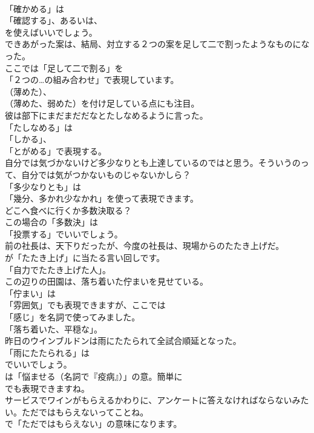 \documentclass[8pt]{extreport}
\begin{document}
\begin{CJK}{UTF8}{min}
\\	「確かめる」は
\\	「確認する」、あるいは、
\\	を使えばいいでしょう。	
\\	できあがった案は、結局、対立する２つの案を足して二で割ったようなものになった。 
\\	ここでは「足して二で割る」を 
\\	「２つの…の組み合わせ」で表現しています。
\\	（薄めた）、
\\	（薄めた、弱めた）を付け足している点にも注目。	
\\	彼は部下にまだまだだなとたしなめるように言った。 
\\	「たしなめる」は
\\	「しかる」、
\\	「とがめる」で表現する。	
\\	自分では気づかないけど多少なりとも上達しているのではと思う。そういうのって、自分では気がつかないものじゃないかしら？ 
\\	「多少なりとも」は
\\	「幾分、多かれ少なかれ」を使って表現できます。	
\\	どこへ食べに行くか多数決取る？ 
\\	この場合の「多数決」は
\\	「投票する」でいいでしょう。	
\\	前の社長は、天下りだったが、今度の社長は、現場からのたたき上げだ。 
\\	が「たたき上げ」に当たる言い回しです。
\\	「自力でたたき上げた人」。	
\\	この辺りの田園は、落ち着いた佇まいを見せている。 
\\	「佇まい」は
\\	「雰囲気」でも表現できますが、ここでは
\\	「感じ」を名詞で使ってみました。
\\	「落ち着いた、平穏な」。	
\\	昨日のウインブルドンは雨にたたられて全試合順延となった。 
\\	「雨にたたられる」は
\\	でいいでしょう。
\\	は「悩ませる（名詞で『疫病』）」の意。簡単に
\\	でも表現できますね。	
\\	サービスでワインがもらえるかわりに、アンケートに答えなければならないみたい。ただではもらえないってことね。 
\\	で「ただではもらえない」の意味になります。

\end{CJK}
\end{document}
